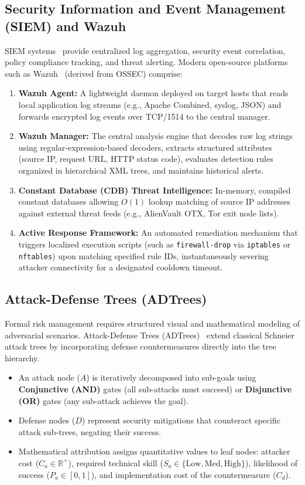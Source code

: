 \subsection{Security Information and Event Management (SIEM) and Wazuh}
SIEM systems~\citep{chuvakin2012siem} provide centralized log aggregation, security event correlation, policy compliance tracking, and threat alerting. Modern open-source platforms such as Wazuh~\citep{wazuh2026} (derived from OSSEC) comprise:
\begin{enumerate}
    \item \textbf{Wazuh Agent:} A lightweight daemon deployed on target hosts that reads local application log streams (e.g., Apache Combined, syslog, JSON) and forwards encrypted log events over TCP/1514 to the central manager.
    \item \textbf{Wazuh Manager:} The central analysis engine that decodes raw log strings using regular-expression-based decoders, extracts structured attributes (source IP, request URL, HTTP status code), evaluates detection rules organized in hierarchical XML trees, and maintains historical alerts.
    \item \textbf{Constant Database (CDB) Threat Intelligence:} In-memory, compiled constant databases allowing $O(1)$ lookup matching of source IP addresses against external threat feeds (e.g., AlienVault OTX, Tor exit node lists).
    \item \textbf{Active Response Framework:} An automated remediation mechanism that triggers localized execution scripts (such as \texttt{firewall-drop} via \texttt{iptables} or \texttt{nftables}) upon matching specified rule IDs, instantaneously severing attacker connectivity for a designated cooldown timeout.
\end{enumerate}

\subsection{Attack-Defense Trees (ADTrees)}
Formal risk management requires structured visual and mathematical modeling of adversarial scenarios. Attack-Defense Trees (ADTrees)~\citep{kordy2014dag} extend classical Schneier attack trees by incorporating defense countermeasures directly into the tree hierarchy. 
\begin{itemize}
    \item An attack node ($A$) is iteratively decomposed into sub-goals using \textbf{Conjunctive (AND)} gates (all sub-attacks must succeed) or \textbf{Disjunctive (OR)} gates (any sub-attack achieves the goal).
    \item Defense nodes ($D$) represent security mitigations that counteract specific attack sub-trees, negating their success.
    \item Mathematical attribution assigns quantitative values to leaf nodes: attacker cost ($C_a \in \mathbb{R}^+$), required technical skill ($S_a \in \{\text{Low}, \text{Med}, \text{High}\}$), likelihood of success ($P_a \in [0, 1]$), and implementation cost of the countermeasure ($C_d$).
\end{itemize}

